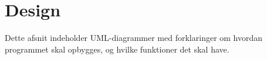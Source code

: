 \chapter{Design}
Dette afsnit indeholder UML-diagrammer med forklaringer om hvordan programmet skal opbygges, og hvilke funktioner det skal have.
